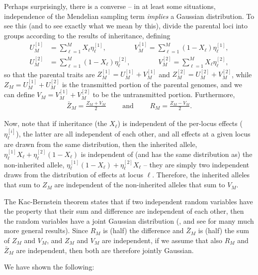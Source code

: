 \documentclass{article}
\newcommand{\1}{\mathbbm{1}}
\theoremstyle{remark}
\theoremstyle{definition}
\begin{document}
Perhaps surprisingly, there is a converse --
in at least some situations,
independence of the Mendelian sampling term \emph{implies} a Gaussian distribution.
To see this (and to see exactly what we mean by this),
divide the parental loci into groups according to the results of inheritance,
defining
\begin{align*}
    U_M^{[1]} &= \sum_{\ell=1}^M X_\ell \eta_\ell^{[1]}  ,
    \qquad \qquad
    V_M^{[1]} = \sum_{\ell=1}^M (1-X_\ell) \eta_\ell^{[1]} ,  \\
    U_M^{[2]} &= \sum_{\ell=1}^M (1-X_\ell) \eta_\ell^{[2]} ,
    \qquad \qquad
    V_M^{[2]} = \sum_{\ell=1}^M X_\ell \eta_\ell^{[2]}  ,
\end{align*}
so that the parental traits are
$Z_M^{[1]} = U_M^{[1]} + V_M^{[1]}$ and
$Z_M^{[2]} = U_M^{[2]} + V_M^{[2]}$, while
$Z_M = U_M^{[1]} + U_M^{[2]}$ is the transmitted portion of the parental genomes,
and we can define $V_M = V_M^{[1]} + V_M^{[2]}$ to be the untransmitted portion.
Furthermore,
\begin{align*}
    \bar Z_M = \frac{Z_M + V_M}{2}
    \qquad \text{ and } \qquad
    R_M = \frac{Z_M - V_M}{ 2 } .
\end{align*}

Now, note that if inheritance (the $X_\ell$) is independent of the per-locus effects ($\eta_\ell^{[i]}$),
the latter are all independent of each other,
and all effects at a given locus are drawn from the same distribution,
then the inherited allele, 
$\eta_\ell^{[1]} X_\ell + \eta_\ell^{[2]} (1-X_\ell)$
is independent of (and has the same distribution as)
the non-inherited allele,
$\eta_\ell^{[1]} (1-X_\ell) + \eta_\ell^{[2]} X_\ell$
-- they are simply two independent draws from the distribution of effects at locus $\ell$.
Therefore, the inherited alleles that sum to $Z_M$
are independent of the non-inherited alleles that sum to $V_M$.

The Kac-Bernstein theorem states that if two independent random variables
have the property that their sum and difference are independent of each other,
then the random variables have a joint Gaussian distribution
(\citet{kac1939characterization,bernstein1941property},
and see \citet{kagan1973characterization} for many much more general results).
Since $R_M$ is (half) the difference and $\bar Z_M$ is (half) the sum
of $Z_M$ and $V_M$, and $Z_M$ and $V_M$ are independent,
if we assume that also $R_M$ and $\bar Z_M$ are independent,
then both are therefore jointly Gaussian.

We have shown the following:
\end{document}
